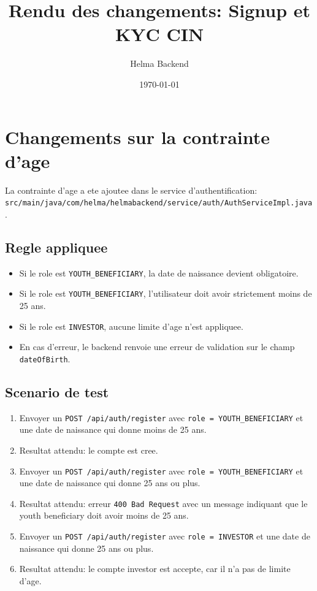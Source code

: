 \documentclass[12pt,a4paper]{article}
\title{Rendu des changements: Signup et KYC CIN}
\author{Helma Backend}
\date{\today}
\begin{document}
\maketitle

\section{Changements sur la contrainte d'age}

La contrainte d'age a ete ajoutee dans le service d'authentification:
\texttt{src/main/java/com/helma/helmabackend/service/auth/AuthServiceImpl.java}.

\subsection{Regle appliquee}

\begin{itemize}
    \item Si le role est \texttt{YOUTH\_BENEFICIARY}, la date de naissance devient obligatoire.
    \item Si le role est \texttt{YOUTH\_BENEFICIARY}, l'utilisateur doit avoir strictement moins de 25 ans.
    \item Si le role est \texttt{INVESTOR}, aucune limite d'age n'est appliquee.
    \item En cas d'erreur, le backend renvoie une erreur de validation sur le champ \texttt{dateOfBirth}.
\end{itemize}

\subsection{Scenario de test}

\begin{enumerate}
    \item Envoyer un \texttt{POST /api/auth/register} avec \texttt{role = YOUTH\_BENEFICIARY} et une date de naissance qui donne moins de 25 ans.
    \item Resultat attendu: le compte est cree.
    \item Envoyer un \texttt{POST /api/auth/register} avec \texttt{role = YOUTH\_BENEFICIARY} et une date de naissance qui donne 25 ans ou plus.
    \item Resultat attendu: erreur \texttt{400 Bad Request} avec un message indiquant que le youth beneficiary doit avoir moins de 25 ans.
    \item Envoyer un \texttt{POST /api/auth/register} avec \texttt{role = INVESTOR} et une date de naissance qui donne 25 ans ou plus.
    \item Resultat attendu: le compte investor est accepte, car il n'a pas de limite d'age.
\end{enumerate}
\end{document}
